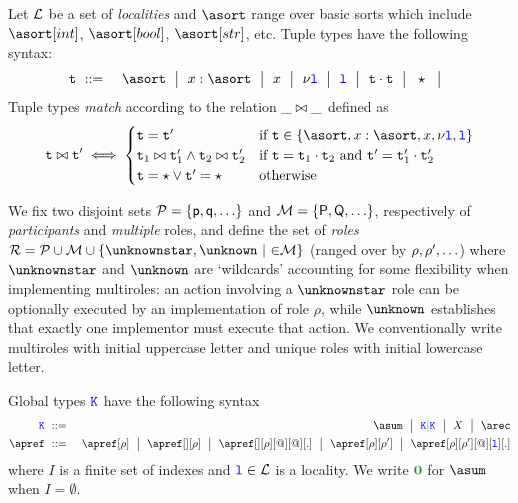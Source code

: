 %
Let $\mathcal{L}$ be a set of \emph{localities} and $\asort$ range over
basic sorts which include $\asort[int]$, $\asort[bool]$,
$\asort[str]$, etc.
%
Tuple types have the following syntax:
\begin{eqnarray*}
  \atuple & \bnfdef & \asort \bnfmid
                      x : \asort \bnfmid
                      x  \bnfmid
                      \nu \aloc \bnfmid
                      \aloc \bnfmid
                      \atuple \cdot \atuple \bnfmid
                      \wildcard \bnfmid
\end{eqnarray*}
%
Tuple types \emph{match} according to the relation $\_ \bowtie \_$ defined as
\[
  \atuple \matches \atuple' \iff
  \begin{cases}
    \atuple = \atuple'  
    & 
    \text{if $\atuple\in\{\asort, x : \asort, x, \nu \aloc, \aloc\}$}
    \\
    \atuple_1 \matches \atuple'_1
    \land \atuple_2 \matches \atuple'_2  & \text{if } \atuple = \atuple_1 \cdot \atuple_2 \text{ and }  \atuple' = \atuple'_1 \cdot \atuple'_2
    \\
    \atuple = \wildcard \vee \atuple' = \wildcard & \text{otherwise}
  \end{cases}
\]

%

We fix two disjoint sets $\participants = \{\ptp p, \ptp q, \ldots\}$ and 
$\multiroles = \{\amulti P, \amulti Q, \ldots \}$, respectively
of \emph{participants} and \emph{multiple} roles, and define the set of
\emph{roles}
$\roleset = \participants \cup \multiroles \cup \{\unknownstar,
\unknown\ |\ \amulti\in\multiroles\}$ (ranged over by $\rho, \rho', \ldots$) where
$\unknownstar$ and $\unknown$ are `wildcards' accounting 
for some flexibility when implementing multiroles:  an action involving a $\unknownstar$ 
role can be optionally executed by an implementation of role  $\rho$,
 while $\unknown$ establishes 
that exactly one implementor must execute that action. 
%
We conventionally write multiroles with initial uppercase letter and
unique roles with initial lowercase letter.

Global types $\texttt{\textcolor{blue}K}$ have the following syntax
\begin{eqnarray*}
  \aK & \bnfdef & \asum \bnfmid
                  \aK \parop \aK \bnfmid
                  X \bnfmid
                  \arec
  \\
  \apref & \bnfdef & \apref[\arole] \bnfmid
                         \apref[{}][\arole] \bnfmid
                         \apref[{}][\arole][@][@][.] \bnfmid
                         \apref[\arole][\arole'] \bnfmid
                         \apref[\arole][\arole'][@][\aloc][.]
\end{eqnarray*}
where $I$ is a finite set of indexes and $\texttt{\color{blue}l} \in \mathcal{L}$ is a
locality. We write  $\nil$ for $\asum$ when $I = \emptyset$.

